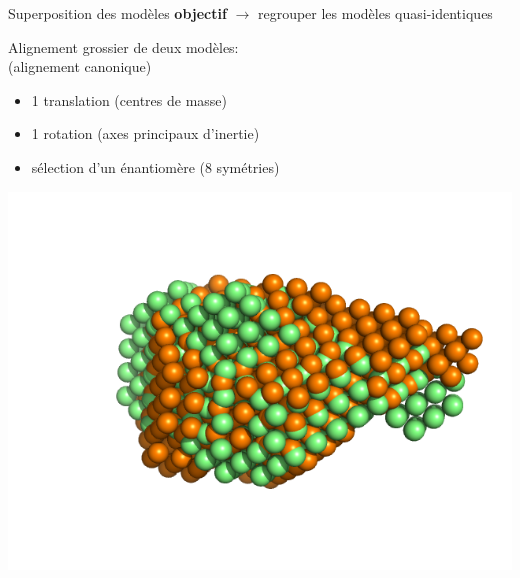 \documentclass{beamer}
\begin{document}
\begin{frame}{Superposition des mod\`eles}
\textbf{objectif} $\longrightarrow$ regrouper les mod\`eles quasi-identiques

\vspace{0.2cm}
\begin{minipage}{0.70\linewidth}
Alignement grossier de deux mod\`eles:\\ 
(alignement canonique)
\begin{itemize}
\item 1 translation (centres de masse)
\item 1 rotation (axes principaux d'inertie)
\item s\'election d'un \'enantiom\`ere (8 sym\'etries)
\end{itemize}

\includegraphics[scale=0.30]{coarsealign.png}


\end{minipage}
\end{frame}
\end{document}
